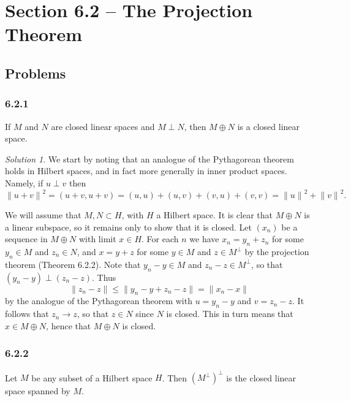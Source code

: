 \documentclass{report}
\newcommand{\norm}[1]{{\lVert #1 \rVert}}
\theoremstyle{remark}
\newtheorem*{solution}{Solution}
\begin{document}
\section*{Section 6.2 -- The Projection Theorem}

\subsection*{Problems}

\subsubsection*{6.2.1}
If $M$ and $N$ are closed linear spaces and $M \perp N$, then $M \oplus N$ is a closed linear space.

\begin{solution}
  We start by noting that an analogue of the Pythagorean theorem holds in Hilbert spaces, and in fact more generally in inner product spaces. Namely, if $u \perp v$ then
  \begin{equation*}
    \norm{u+v}^2 = (u+v,u+v) = (u,u) + (u,v) + (v,u) + (v,v) = \norm{u}^2 + \norm{v}^2.
  \end{equation*}

  We will assume that $M, N \subset H$, with $H$ a Hilbert space. It is clear that $M \oplus N$ is a linear subspace, so it remains only to show that it is closed. Let $(x_n)$ be a sequence in $M \oplus N$ with limit $x \in H$. For each $n$ we have $x_n = y_n + z_n$ for some $y_n \in M$ and $z_n \in N$, and $x = y + z$ for some $y \in M$ and $z \in M^\perp$ by the projection theorem (Theorem 6.2.2). Note that $y_n - y \in M$ and $z_n - z \in M^\perp$, so that $(y_n - y) \perp (z_n - z)$. Thus
  \begin{equation*}
    \norm{z_n - z} \le \norm{y_n - y + z_n - z} = \norm{x_n - x}
  \end{equation*}
  by the analogue of the Pythagorean theorem with $u = y_n - y$ and $v = z_n - z$. It follows that $z_n \to z$, so that $z \in N$ since $N$ is closed. This in turn means that $x \in M \oplus N$, hence that $M \oplus N$ is closed.
\end{solution}

\subsubsection*{6.2.2}
Let $M$ be any subset of a Hilbert space $H$. Then $(M^\perp)^\perp$ is the closed linear space spanned by $M$.
\end{document}
